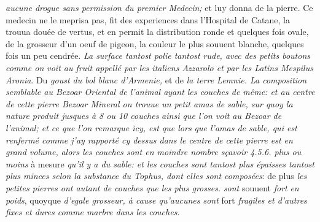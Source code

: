 %
 \textit{aucune drogue sans permission du premier Medecin;}
%
et luy donna de la pierre. Ce medecin ne le meprisa pas, fit des experiences dans l'Hospital de Catane\protect{}, la trouua dou\'{e}e de vertus, et en permit la distribution ronde et quelques fois ovale, de la grosseur d'un oeuf de pigeon, la couleur le plus souuent blanche, quelques fois un peu cendr\'{e}e.
%
\textit{La surface tantost polie tantost rude, avec des petits boutons comme on voit au fruit appell\'{e} par les italiens Azzarolo\protect{} et par les Latins Mespilus Aronia}.
Du \textit{goust du bol blanc\protect{} d'Armenie,\protect{}}
et de \textit{la terre Lemnie.\protect{}
La composition semblable au Bezoar Oriental\protect{} de l'animal ayant les couches de m\^{e}me:
et au centre de cette pierre Bezoar Mineral\protect{} on trouue un petit amas de sable, sur quoy la nature produit jusques \`{a} 8 ou 10 couches} %
%
\textit{ainsi que l'on voit au Bezoar de l'animal;\protect{}
et ce que l'on remarque icy, est que lors que l'amas de sable, qui est renferm\'{e} comme j'ay rapport\'{e} cy dessus dans le centre de cette pierre est en grand volume,}
%
\textit{alors les couches sont en moindre nombre s\c{c}avoir 4.5.6. plus ou moins} \`{a} mesure \textit{qu'il y a du sable: et les couches sont tantost plus \'{e}paisses tantost plus minces selon la substance du Tophus\protect{}, dont elles sont compos\'{e}es}: de plus \textit{les petites pierres ont autant de couches que les plus grosses.}
%
 \textit{sont} souuent
\textit{fort}  \textit{en poids}, quoyque \textit{d'egale grosseur, \`{a} cause qu'aucunes sont} fort \textit{fragiles et d'autres fixes et dures comme marbre dans les couches.}%
